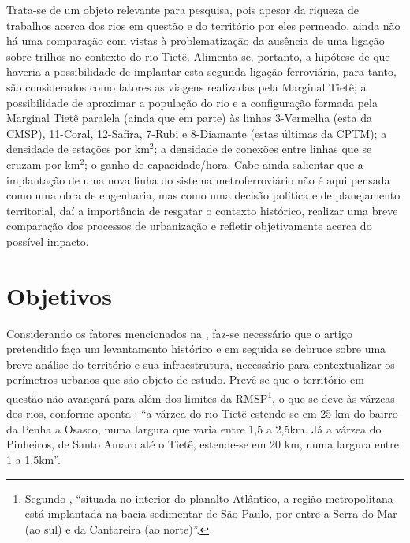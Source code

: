 \documentclass[
	12pt,				%
	openright,			%
	oneside,
	a4paper,			%
	english,			%
	french,				%
	spanish,			%
	brazil,				%
	]{abntex2}
\begin{document}
Trata-se de um objeto relevante para pesquisa, pois apesar da riqueza de trabalhos acerca dos rios em questão e do território por eles permeado, ainda não há uma comparação com vistas à problematização da ausência de uma ligação sobre trilhos no contexto do rio Tietê. Alimenta-se, portanto, a hipótese de que haveria a possibilidade de implantar esta segunda ligação ferroviária, para tanto, são considerados como fatores as viagens realizadas pela Marginal Tietê; a possibilidade de aproximar a população do rio e a configuração formada pela Marginal Tietê paralela (ainda que em parte) às linhas 3-Vermelha (esta da CMSP), 11-Coral, 12-Safira, 7-Rubi e 8-Diamante (estas últimas da CPTM); a densidade de estações por km$^{2}$; a densidade de conexões entre linhas que se cruzam por km$^{2}$; o ganho de capacidade/hora. Cabe ainda salientar que a implantação de uma nova linha do sistema metroferroviário não é aqui pensada como uma obra de engenharia, mas como uma decisão política e de planejamento territorial, daí a importância de resgatar o contexto histórico, realizar uma breve comparação dos processos de urbanização e refletir objetivamente acerca do possível impacto.



\chapter{Objetivos} \label{objetivos}


Considerando os fatores mencionados na , faz-se necessário que o artigo pretendido faça um levantamento histórico e em seguida se debruce sobre uma breve análise do território e sua infraestrutura, necessário para contextualizar os perímetros urbanos que são objeto de estudo. Prevê-se que o território em questão não avançará para além dos limites da RMSP\footnote{Segundo , ``situada no interior do planalto Atlântico, a região metropolitana está implantada na bacia sedimentar de São Paulo, por entre a Serra do Mar (ao sul) e da Cantareira (ao norte)''.}, o que se deve às várzeas dos rios, conforme aponta : ``a várzea do rio Tietê estende-se em 25 km do bairro da Penha a Osasco, numa largura que varia entre 1,5 a 2,5km. Já a várzea do Pinheiros, de Santo Amaro até o Tietê, estende-se em 20 km,
numa largura entre 1 a 1,5km''.
\end{document}
